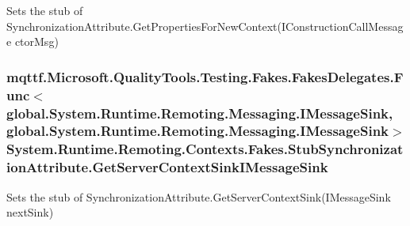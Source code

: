 Sets the stub of Synchronization\-Attribute.\-Get\-Properties\-For\-New\-Context(\-I\-Construction\-Call\-Message ctor\-Msg)

\hypertarget{class_system_1_1_runtime_1_1_remoting_1_1_contexts_1_1_fakes_1_1_stub_synchronization_attribute_ad2abe79f97fcca9c263fda2bc29c4fd7}{
\subsubsection[{Get\-Server\-Context\-Sink\-I\-Message\-Sink}]{\setlength{\rightskip}{0pt plus 5cm}mqttf.\-Microsoft.\-Quality\-Tools.\-Testing.\-Fakes.\-Fakes\-Delegates.\-Func$<$global.\-System.\-Runtime.\-Remoting.\-Messaging.\-I\-Message\-Sink, global.\-System.\-Runtime.\-Remoting.\-Messaging.\-I\-Message\-Sink$>$ System.\-Runtime.\-Remoting.\-Contexts.\-Fakes.\-Stub\-Synchronization\-Attribute.\-Get\-Server\-Context\-Sink\-I\-Message\-Sink}}\label{class_system_1_1_runtime_1_1_remoting_1_1_contexts_1_1_fakes_1_1_stub_synchronization_attribute_ad2abe79f97fcca9c263fda2bc29c4fd7}


Sets the stub of Synchronization\-Attribute.\-Get\-Server\-Context\-Sink(\-I\-Message\-Sink next\-Sink)

